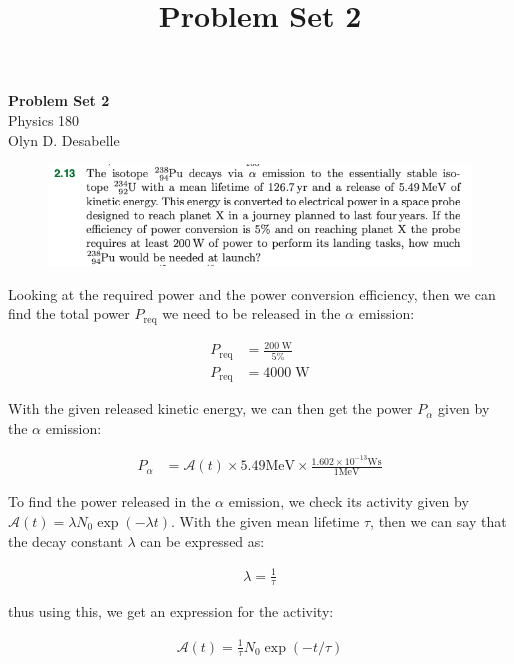 \documentclass[11pt]{article}
\theoremstyle{definition}
\begin{document}
\setcounter{section}{2}
\title{Problem Set 2}


\begin{center}
{\LARGE \bf Problem Set 2}\\
{\large Physics 180}\\
Olyn D. Desabelle
\end{center}

\begin{figure}[h!]
    \centering
    \includegraphics[scale = 0.5]{2.13.png}
\end{figure}

Looking at the required power and the power conversion efficiency, then we can find the total power $P_{\text{req}}$ we need to be released in the $\alpha$ emission:

\begin{align}
    P_{\text{req}} &= \frac{200\;\text{W}}{5\%}\\
    P_{\text{req}} &= 4000\;\text{W}
\end{align}

With the given released kinetic energy, we can then get the power $P_{\alpha}$ given by the $\alpha$ emission:

\begin{align}
    P_{\alpha} &= \mathcal{A}(t)\times 5.49 \text{MeV} \times \frac{1.602\times 10^{-13}\text{Ws}}{1\text{MeV}}
\end{align}

To find the power released in the $\alpha$ emission, we check its activity given by $\mathcal{A} (t) = \lambda N_0 \exp(-\lambda t)$. With the given mean lifetime $\tau$, then we can say that the decay constant $\lambda$ can be expressed as:

\begin{align}
    \lambda = \frac{1}{\tau}
\end{align}

thus using this, we get an expression for the activity:

\begin{align}
    \mathcal{A}(t) = \frac{1}{\tau} N_0 \exp(-t/\tau)
\end{align}
\end{document}
